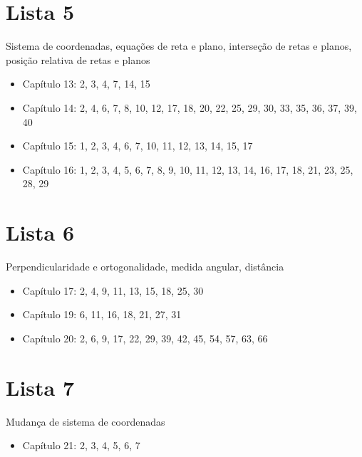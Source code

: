 \documentclass[brazilian, fleqn]{article}
\begin{document}
\section{Lista 5}
Sistema de coordenadas, equações de reta e plano, interseção de retas e planos, posição relativa de retas e planos
\begin{itemize}
    \item Capítulo 13: 2, 3, 4, 7, 14, 15
    \item Capítulo 14: 2, 4, 6, 7, 8, 10, 12, 17, 18, 20, 22, 25, 29, 30, 33, 35, 36, 37, 39, 40
    \item Capítulo 15: 1, 2, 3, 4, 6, 7, 10, 11, 12, 13, 14, 15, 17
    \item Capítulo 16: 1, 2, 3, 4, 5, 6, 7, 8, 9, 10, 11, 12, 13, 14, 16, 17, 18, 21, 23, 25, 28, 29
\end{itemize}

\section{Lista 6}
Perpendicularidade e ortogonalidade, medida angular, distância
\begin{itemize}
    \item Capítulo 17: 2, 4, 9, 11, 13, 15, 18, 25, 30
    \item Capítulo 19: 6, 11, 16, 18, 21, 27, 31
    \item Capítulo 20: 2, 6, 9, 17, 22, 29, 39, 42, 45, 54, 57, 63, 66
\end{itemize}

\section{Lista 7}
Mudança de sistema de coordenadas
\begin{itemize}
    \item Capítulo 21: 2, 3, 4, 5, 6, 7
\end{itemize}
\end{document}
